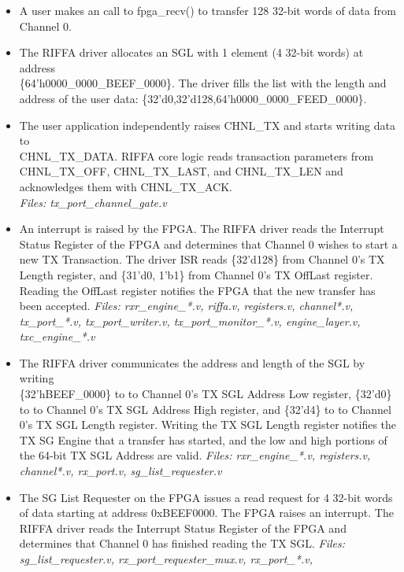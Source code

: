 \documentclass{refrep}
\begin{document}
\begin{itemize}
 \item A user makes an call to fpga\_recv() to transfer 128 32-bit words of data
   from Channel 0.
 \item The RIFFA driver allocates an SGL with 1 element (4 32-bit words) at
   address\\ \{64'h0000\_0000\_BEEF\_0000\}. The driver fills the list with the
   length and address of the user data:
    \{32'd0,32'd128,64'h0000\_0000\_FEED\_0000\}.
  \item The user application independently raises CHNL\_TX and starts writing data to\\
    CHNL\_TX\_DATA. RIFFA core logic reads transaction parameters from
    CHNL\_TX\_OFF, CHNL\_TX\_LAST, and CHNL\_TX\_LEN and acknowledges them with
    CHNL\_TX\_ACK. \\\textit{Files: tx\_port\_channel\_gate.v}
  \item An interrupt is raised by the FPGA. The RIFFA driver reads the Interrupt
    Status Register of the FPGA and determines that Channel 0 wishes to start a
    new TX Transaction. The driver ISR reads \{32'd128\} from Channel 0's TX
    Length register, and \{31'd0, 1'b1\} from Channel 0's TX OffLast
    register. Reading the OffLast register notifies the FPGA that the new
    transfer has been accepted. \textit{Files: rxr\_engine\_*.v, riffa.v,
      registers.v, channel*.v, tx\_port\_*.v, tx\_port\_writer.v,
      tx\_port\_monitor\_*.v, engine\_layer.v, txc\_engine\_*.v}
 \item The RIFFA driver communicates the address and length of the SGL by
   writing\\ \{32'hBEEF\_0000\} to to Channel 0's TX SGL Address Low register,
   \{32'd0\} to to Channel 0's TX SGL Address High register, and \{32'd4\} to to
   Channel 0's TX SGL Length register. Writing the TX SGL Length register
   notifies the TX SG Engine that a transfer has started, and the low and high
   portions of the 64-bit TX SGL Address are valid. \textit{Files:
     rxr\_engine\_*.v, registers.v, channel*.v, rx\_port.v,
     sg\_list\_requester.v}
 \item The SG List Requester on the FPGA issues a read request for 4 32-bit
   words of data starting at address 0xBEEF0000. The FPGA raises an
   interrupt. The RIFFA driver reads the Interrupt Status Register of the FPGA
   and determines that Channel 0 has finished reading the TX SGL. \textit{Files:
     sg\_list\_requester.v, rx\_port\_requester\_mux.v, rx\_port\_*.v,
}
\end{itemize}
\end{document}
